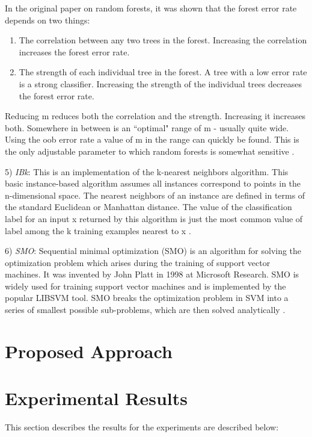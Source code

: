\documentclass[conference]{IEEEtran}
\begin{document}
In the original paper on random forests, it was shown that the forest error rate depends on two things:

\begin{enumerate}
\item The correlation between any two trees in the forest. Increasing the correlation increases the forest error rate.
\item The strength of each individual tree in the forest. A tree with a low error rate is a strong classifier. Increasing the strength of the individual trees decreases the forest error rate.
\end{enumerate}

Reducing m reduces both the correlation and the strength. Increasing it increases both. Somewhere in between is an ``optimal" range of m - usually quite wide. Using the oob error rate a value of m in the range can quickly be found. This is the only adjustable parameter to which random forests is somewhat sensitive \cite{breiman}.

5) \textit{IBk}: This is an implementation of the k-nearest neighbors algorithm. This basic instance-based algorithm assumes all instances correspond to points in the n-dimensional space. The nearest neighbors of an instance are defined in terms of the standard Euclidean or Manhattan distance. The value of the classification label for an input x returned by this algorithm is just the most common value of label among the k training examples nearest to x \cite{Mitchell}.

6) \textit{SMO}: Sequential minimal optimization (SMO) is an algorithm for solving the optimization problem which arises during the training of support vector machines. It was invented by John Platt in 1998 at Microsoft Research. SMO is widely used for training support vector machines and is implemented by the popular LIBSVM tool. SMO breaks the optimization problem in SVM into a series of smallest possible sub-problems, which are then solved analytically \cite{smo}.

\section{Proposed Approach}

\section{Experimental Results}

This section describes the results for the experiments are described below:
\end{document}
